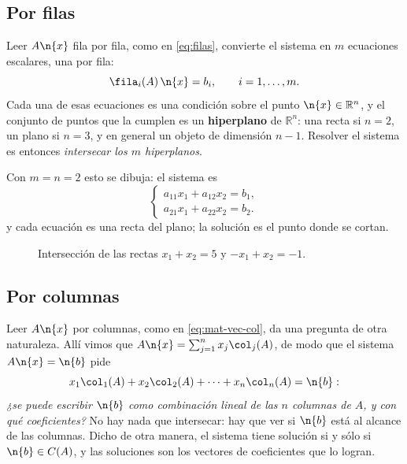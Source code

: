 \subsection*{Por filas}

Leer $A\n{x}$ fila por fila, como en \eqref{eq:filas}, convierte el sistema en
$m$ ecuaciones escalares, una por fila:
\[
\fila_i(A)\,\n{x} = b_i, \qquad i=1,\dots,m .
\]
Cada una de esas ecuaciones es una condición sobre el punto
$\n{x}\in\mathbb{R}^n$, y el conjunto de puntos que la cumplen es un
\textbf{hiperplano} de $\mathbb{R}^n$: una recta si $n=2$, un plano si $n=3$,
y en general un objeto de dimensión $n-1$. Resolver el sistema es entonces
\emph{intersecar los $m$ hiperplanos}.

Con $m=n=2$ esto se dibuja: el sistema es
\[
\begin{cases}
a_{11}x_1 + a_{12}x_2 = b_1, \\
a_{21}x_1 + a_{22}x_2 = b_2.
\end{cases}
\]
y cada ecuación es una recta del plano; la solución es el punto donde se
cortan.

\begin{figure}[ht]
\centering
{}
\caption{Intersección de las rectas $x_1+x_2=5$ y $-x_1+x_2=-1$.}
\end{figure}

\subsection*{Por columnas}

Leer $A\n{x}$ por columnas, como en \eqref{eq:mat-vec-col}, da una pregunta de
otra naturaleza. Allí vimos que $A\n{x}=\sum_{j=1}^n x_j\col_j(A)$, de modo que
el sistema $A\n{x}=\n{b}$ pide
\[
x_1\col_1(A) + x_2\col_2(A) + \cdots + x_n\col_n(A) = \n{b} :
\]
\emph{¿se puede escribir $\n{b}$ como combinación lineal de las $n$ columnas de
$A$, y con qué coeficientes?} No hay nada que intersecar: hay que ver si $\n{b}$
está al alcance de las columnas. Dicho de otra manera, el sistema tiene solución
si y sólo si $\n{b}\in C(A)$, y las soluciones son los vectores de coeficientes
que lo logran.

